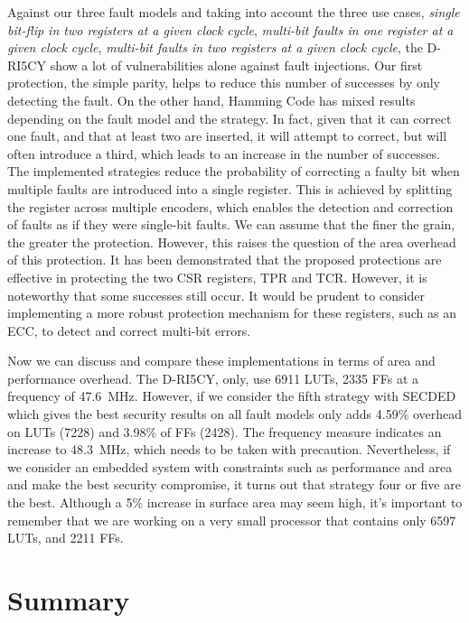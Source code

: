 Against our three fault models and taking into account the three use cases, \textit{single bit-flip in two registers at a given clock cycle}, \textit{multi-bit faults in one register at a given clock cycle}, \textit{multi-bit faults in two registers at a given clock cycle}, the D-RI5CY show a lot of vulnerabilities alone against fault injections. Our first protection, the simple parity, helps to reduce this number of successes by only detecting the fault. On the other hand, Hamming Code has mixed results depending on the fault model and the strategy. In fact, given that it can correct one fault, and that at least two are inserted, it will attempt to correct, but will often introduce a third, which leads to an increase in the number of successes. The implemented strategies reduce the probability of correcting a faulty bit when multiple faults are introduced into a single register. This is achieved by splitting the register across multiple encoders, which enables the detection and correction of faults as if they were single-bit faults. We can assume that the finer the grain, the greater the protection. However, this raises the question of the area overhead of this protection. It has been demonstrated that the proposed protections are effective in protecting the two CSR registers, TPR and TCR. However, it is noteworthy that some successes still occur. It would be prudent to consider implementing a more robust protection mechanism for these registers, such as an ECC, to detect and correct multi-bit errors.

Now we can discuss and compare these implementations in terms of area and performance overhead. The D-RI5CY, only, use 6911 LUTs, 2335 FFs at a frequency of \SI{47.6}{\mega\hertz}. However, if we consider the fifth strategy with SECDED which gives the best security results on all fault models only adds 4.59\% overhead on LUTs (7228) and 3.98\% of FFs (2428). The frequency measure indicates an increase to \SI{48.3}{\mega\hertz}, which needs to be taken with precaution.
Nevertheless, if we consider an embedded system with constraints such as performance and area and make the best security compromise, it turns out that strategy four or five are the best. Although a 5\% increase in surface area may seem high, it's important to remember that we are working on a very small processor that contains only 6597 LUTs, and 2211 FFs.

\section{Summary}

